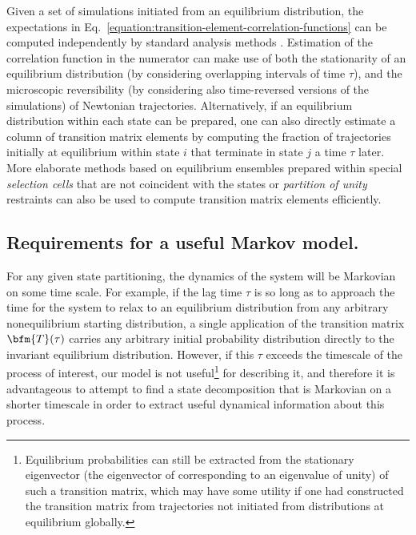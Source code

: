 Given a set of simulations initiated from an equilibrium distribution, the expectations in Eq.\ \ref{equation:transition-element-correlation-functions} can be computed independently by standard analysis methods \cite{allen:1991a}.
Estimation of the correlation function in the numerator can make use of both the stationarity of an equilibrium distribution (by considering overlapping intervals of time $\tau$), and the microscopic reversibility (by considering also time-reversed versions of the simulations) 
of Newtonian trajectories.
Alternatively, if an equilibrium distribution within each state can be prepared, one can also directly estimate a column of transition matrix elements by computing the fraction of trajectories initially at equilibrium within state $i$ that terminate in state $j$ a time $\tau$ later.
More elaborate methods based on equilibrium ensembles prepared within special \emph{selection cells} that are not coincident with the states \cite{swope:2004a,swope:2004b} or \emph{partition of unity} restraints \cite{weber-thesis:2006a} can also be used to compute transition matrix elements efficiently.

\subsection{Requirements for a useful Markov model.}
\label{section:theory:requirements-for-markovian-behavior}

For any given state partitioning, the dynamics of the system will be Markovian on some time scale.
For example, if the lag time $\tau$ is so long as to approach the time for the system to relax to an equilibrium distribution from any arbitrary nonequilibrium starting distribution, a single application of the transition matrix $\bfm{T}(\tau)$ carries any arbitrary initial probability distribution directly to the invariant equilibrium distribution.
However, if this $\tau$ exceeds the timescale of the process of interest, our model is not useful\footnote{Equilibrium probabilities can still be extracted from the stationary eigenvector (the eigenvector of corresponding to an eigenvalue of unity) of such a transition matrix, which may have some utility if one had constructed the transition matrix from trajectories not initiated from distributions at equilibrium globally.} for describing it, and therefore it is advantageous to attempt to find a state decomposition that is Markovian on a shorter timescale in order to extract useful dynamical information about this process. 

